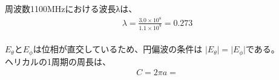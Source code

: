 \documentclass[dvipdfmx,autodetect-engine,titlepage]{jsarticle}
\begin{document}
周波数1100MHzにおける波長λは、
\begin{eqnarray*}
  \lambda  = \frac{3.0 \times 10^8}{1.1 \times 10^9} = 0.273
\end{eqnarray*}
　\\
\begin{math}
  E_{\theta }とE_{\phi }
\end{math}は位相が直交しているため、円偏波の条件は
\begin{math}
  | E_{\theta } \vert = | E_{\phi }\vert 
\end{math}である。\\

ヘリカルの1周期の周長は、
\begin{eqnarray*}
  C = 2\pi a = 
\end{eqnarray*}
\end{document}
